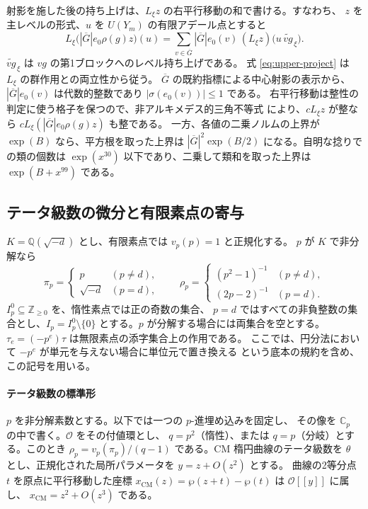 射影を施した後の持ち上げは、\(L_\xi z\) の右平行移動の和で書ける。すなわち、
\(z\) を主レベルの形式、\(u\) を \(U(Y_m)\) の有限アデール点とすると
\begin{equation}\label{eq:upper-project}
 L_\xi\bigl(|\overline G|e_0\rho(g)z\bigr)(u)
 =
 \sum_{v\in\overline G}|\overline G|e_0(v)\,
            (L_\xi z)\bigl(u\,\widetilde{vg}_{\,\xi}\bigr).
\end{equation}
\(\widetilde{vg}_{\,\xi}\) は \(vg\) の第1ブロックへのレベル持ち上げである。
式 \eqref{eq:upper-project} は \(L_\xi\) の群作用との両立性から従う。
\(\overline G\) の既約指標による中心射影の表示から、
\(|\overline G|e_0(v)\) は代数的整数であり
\(|\sigma(e_0(v))|\le 1\) である。
右平行移動は整性の判定に使う格子を保つので、非アルキメデス的三角不等式
により、\(cL_\xi z\) が整なら \(cL_\xi(|\overline G|e_0\rho(g)z)\) も整である。
一方、各値の二乗ノルムの上界が \(\exp(B)\) なら、平方根を取った上界は
\(|\overline G|^2\exp(B/2)\) になる。自明な捻りでの類の個数は
\(\exp(x^{30})\) 以下であり、二乗して類和を取った上界は
\(\exp(B+x^{99})\) である。

\subsection{テータ級数の微分と有限素点の寄与}

\(K=\mathbb Q(\sqrt{-d})\) とし、有限素点では \(v_p(p)=1\) と正規化する。
\(p\) が \(K\) で非分解なら
\[
  \pi_p=\begin{cases}p & (p\ne d),\\ \sqrt{-d}&(p=d),\end{cases}
  \qquad
  \rho_p=\begin{cases}(p^2-1)^{-1}&(p\ne d),\\
                        (2p-2)^{-1}&(p=d).\end{cases}
\]
\(I_p^0\subseteq\mathbb Z_{\ge0}\) を、惰性素点では正の奇数の集合、
\(p=d\) ではすべての非負整数の集合とし、\(I_p=I_p^0\setminus\{0\}\)
とする。\(p\) が分解する場合には両集合を空とする。
\(\tau_e=(-p^e)\tau\) は無限素点の添字集合上の作用である。
ここでは、円分法において \(-p^e\) が単元を与えない場合に単位元で置き換える
という底本の規約を含め、この記号を用いる。

\paragraph{テータ級数の標準形}
\(p\) を非分解素数とする。以下では一つの \(p\)-進埋め込みを固定し、
その像を \(\mathbb C_p\) の中で書く。\(\mathcal O\) をその付値環とし、
\(q=p^2\)（惰性）、または \(q=p\)（分岐）とする。このとき
\(\rho_p=v_p(\pi_p)/(q-1)\) である。CM 楕円曲線のテータ級数を
\(\theta\) とし、正規化された局所パラメータを \(y=z+O(z^2)\) とする。
曲線の2等分点 \(t\) を原点に平行移動した座標
\(x_\mathrm{CM}(z)=\wp(z+t)-\wp(t)\) は \(\mathcal O[[y]]\) に属し、
\(x_\mathrm{CM}=z^2+O(z^3)\) である。

